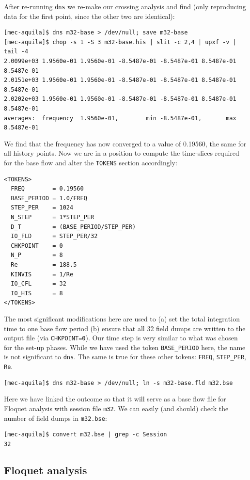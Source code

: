 \documentclass[11pt,a4paper]{report}
\begin{document}
After re-running \verb+dns+ we re-make our crossing analysis and find
(only reproducing data for the first point, since the other two are
identical):
\begin{verbatim}
[mec-aquila]$ dns m32-base > /dev/null; save m32-base
[mec-aquila]$ chop -s 1 -S 3 m32-base.his | slit -c 2,4 | upxf -v | tail -4 
2.0099e+03 1.9560e-01 1.9560e-01 -8.5487e-01 -8.5487e-01 8.5487e-01 8.5487e-01
2.0151e+03 1.9560e-01 1.9560e-01 -8.5487e-01 -8.5487e-01 8.5487e-01 8.5487e-01
2.0202e+03 1.9560e-01 1.9560e-01 -8.5487e-01 -8.5487e-01 8.5487e-01 8.5487e-01
averages:  frequency  1.9560e-01,        min -8.5487e-01,       max 8.5487e-01
\end{verbatim}
\noindent We find that the frequency has now converged to a value of
0.19560, the same for all history points.  Now we are in a position to
compute the time-slices required for the base flow and alter the
\verb+TOKENS+ section accordingly:
{\small
\begin{verbatim}
<TOKENS>
  FREQ        = 0.19560
  BASE_PERIOD = 1.0/FREQ
  STEP_PER    = 1024
  N_STEP      = 1*STEP_PER
  D_T         = (BASE_PERIOD/STEP_PER)
  IO_FLD      = STEP_PER/32
  CHKPOINT    = 0
  N_P         = 8
  Re          = 188.5
  KINVIS      = 1/Re
  IO_CFL      = 32
  IO_HIS      = 8
</TOKENS>
\end{verbatim}
}
\noindent
The most significant modifications here are used to (a) set the total
integration time to one base flow period (b) ensure that all 32
field dumps are written to the output file (via \verb+CHKPOINT=0+).
Our time step is very similar to what was chosen for the set-up
phases.  While we have used the token \verb+BASE_PERIOD+ here, the
name is not significant to \verb+dns+. The same is true for these
other tokens: \verb+FREQ+, \verb+STEP_PER+, \verb+Re+.
\begin{verbatim}
[mec-aquila]$ dns m32-base > /dev/null; ln -s m32-base.fld m32.bse
\end{verbatim}
\noindent Here we have linked the outcome so that it will serve as a
base flow file for Floquet analysis with session file \verb+m32+.  We
can easily (and should) check the number of field dumps in
\verb+m32.bse+:
\begin{verbatim}
[mec-aquila]$ convert m32.bse | grep -c Session
32
\end{verbatim}

\subsection{Floquet analysis}
\end{document}
